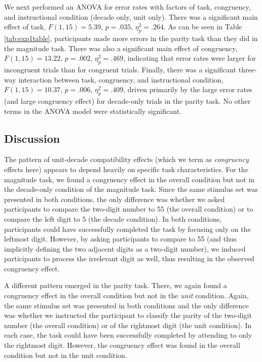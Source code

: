 \documentclass[english,man]{apa6}
\theoremstyle{definition}
\theoremstyle{definition}
\theoremstyle{definition}
\theoremstyle{remark}
\begin{document}
We next performed an ANOVA for error rates with factors of task,
congruency, and instructional condition (decade only, unit only). There
was a significant main effect of task, \(F(1, 15) = 5.39\),
\(p = .035\), \(\eta^2_p = .264\). As can be seen in Table
\ref{tab:exp1table}, participants made more errors in the parity task
than they did in the magnitude task. There was also a significant main
effect of congruency, \(F(1, 15) = 13.22\), \(p = .002\),
\(\eta^2_p = .469\), indicating that error rates were larger for
incongruent trials than for congruent trials. Finally, there was a
significant three-way interaction between task, congruency, and
instructional condition, \(F(1, 15) = 10.37\), \(p = .006\),
\(\eta^2_p = .409\), driven primarily by the large error rates (and
large congruency effect) for decade-only trials in the parity task. No
other terms in the ANOVA model were statistically significant.

\subsection{Discussion}\label{discussion}

The pattern of unit-decade compatibility effects (which we term as
\emph{congruency} effects here) appears to depend heavily on specific
task characteristics. For the magnitude task, we found a congruency
effect in the overall condition but not in the decade-only condition of
the magnitude task. Since the same stimulus set was presented in both
conditions, the only difference was whether we asked participants to
compare the two-digit number to 55 (the overall condition) or to compare
the left digit to 5 (the decade condition). In both conditions,
participants could have successfully completed the task by focusing only
on the leftmost digit. However, by asking participants to compare to 55
(and thus implicitly defining the two adjacent digits as a two-digit
number), we induced participants to process the irrelevant digit as
well, thus resulting in the observed congruency effect.

A different pattern emerged in the parity task. There, we again found a
congruency effect in the overall condition but not in the \emph{unit}
condition. Again, the same stimulus set was presented in both conditions
and the only difference was whether we instructed the participant to
classify the parity of the two-digit number (the overall condition) or
of the rightmost digit (the unit condition). In each case, the task
could have been successfully completed by attending to only the
rightmost digit. However, the congruency effect was found in the overall
condition but not in the unit condition.
\end{document}
